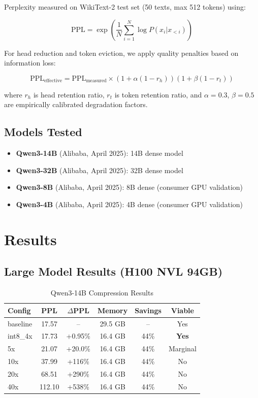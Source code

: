 \documentclass[11pt]{article}
\begin{document}
Perplexity measured on WikiText-2 test set (50 texts, max 512 tokens) using:

\begin{equation}
\text{PPL} = \exp\left(\frac{1}{N}\sum_{i=1}^{N} \log P(x_i | x_{<i})\right)
\end{equation}

For head reduction and token eviction, we apply quality penalties based on information loss:

\begin{equation}
\text{PPL}_{\text{effective}} = \text{PPL}_{\text{measured}} \times (1 + \alpha(1 - r_h))(1 + \beta(1 - r_t))
\end{equation}

where $r_h$ is head retention ratio, $r_t$ is token retention ratio, and $\alpha=0.3$, $\beta=0.5$ are empirically calibrated degradation factors.

\subsection{Models Tested}

\begin{itemize}
    \item \textbf{Qwen3-14B} (Alibaba, April 2025): 14B dense model
    \item \textbf{Qwen3-32B} (Alibaba, April 2025): 32B dense model
    \item \textbf{Qwen3-8B} (Alibaba, April 2025): 8B dense (consumer GPU validation)
    \item \textbf{Qwen3-4B} (Alibaba, April 2025): 4B dense (consumer GPU validation)
\end{itemize}

\section{Results}

\subsection{Large Model Results (H100 NVL 94GB)}

\begin{table}[h]
\centering
\caption{Qwen3-14B Compression Results}
\label{tab:qwen3-14b}
\begin{tabular}{@{}lccccc@{}}
\toprule
Config & PPL & $\Delta$PPL & Memory & Savings & Viable \\
\midrule
baseline & 17.57 & -- & 29.5 GB & -- & Yes \\
int8\_4x & 17.73 & +0.95\% & 16.4 GB & 44\% & \textbf{Yes} \\
5x & 21.07 & +20.0\% & 16.4 GB & 44\% & Marginal \\
10x & 37.99 & +116\% & 16.4 GB & 44\% & No \\
20x & 68.51 & +290\% & 16.4 GB & 44\% & No \\
40x & 112.10 & +538\% & 16.4 GB & 44\% & No \\
\bottomrule
\end{tabular}
\end{table}
\end{document}
